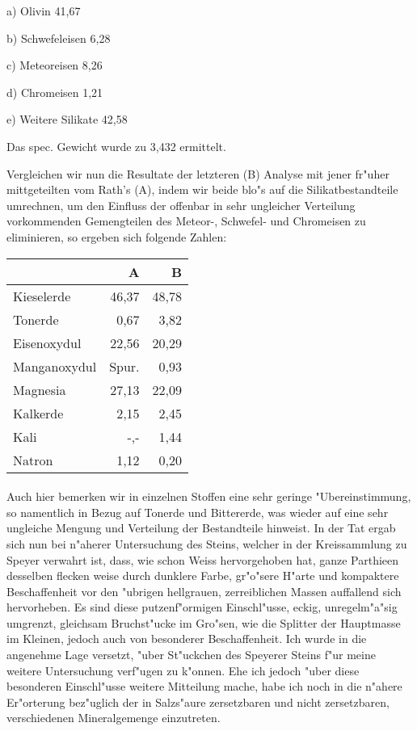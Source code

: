 \documentclass[a4paper, 11pt, oneside]{article}
\begin{document}
a) Olivin 41,67

b) Schwefeleisen 6,28

c) Meteoreisen 8,26

d) Chromeisen 1,21

e) Weitere Silikate 42,58

Das spec. Gewicht wurde zu 3,432 ermittelt.

Vergleichen wir nun die Resultate der letzteren (B) Analyse mit jener fr"uher mittgeteilten vom Rath's (A), indem wir beide blo"s auf die Silikatbestandteile umrechnen, um den Einfluss der offenbar in sehr ungleicher Verteilung vorkommenden Gemengteilen des Meteor-, Schwefel- und Chromeisen zu eliminieren, so ergeben sich folgende Zahlen:
\begin{center}
    \begin{tabular}{ |l|r|r| }
    \hline
    & A & B\\
    \hline\hline
    Kieselerde & 46,37 & 48,78\\\hline
    Tonerde & 0,67 & 3,82\\\hline
    Eisenoxydul & 22,56 & 20,29\\\hline
    Manganoxydul & Spur. & 0,93\\\hline
    Magnesia & 27,13 & 22,09\\\hline
    Kalkerde & 2,15 & 2,45\\\hline
    Kali & -,- & 1,44\\\hline
    Natron & 1,12 & 0,20\\
    \hline
    \end{tabular}
\end{center}
\paragraph{}
Auch hier bemerken wir in einzelnen Stoffen eine sehr geringe "Ubereinstimmung, so namentlich in Bezug auf Tonerde und Bittererde, was wieder auf eine sehr ungleiche Mengung und Verteilung der Bestandteile hinweist. In der Tat ergab sich nun bei n"aherer Untersuchung des Steins, welcher in der Kreissammlung zu Speyer verwahrt ist, dass, wie schon Weiss hervorgehoben hat, ganze Parthieen desselben flecken weise durch dunklere Farbe, gr"o"sere H"arte und kompaktere Beschaffenheit vor den "ubrigen hellgrauen, zerreiblichen Massen auffallend sich hervorheben. Es sind diese putzenf"ormigen Einschl"usse, eckig, unregelm"a"sig umgrenzt, gleichsam Bruchst"ucke im Gro"sen, wie die Splitter der Hauptmasse im Kleinen, jedoch auch von besonderer Beschaffenheit. Ich wurde in die angenehme Lage versetzt, "uber St"uckchen des Speyerer Steins f"ur meine weitere Untersuchung verf"ugen zu k"onnen. Ehe ich jedoch "uber diese besonderen Einschl"usse weitere Mitteilung mache, habe ich noch in die n"ahere Er"orterung bez"uglich der in Salzs"aure zersetzbaren und nicht zersetzbaren, verschiedenen Mineralgemenge einzutreten.
\end{document}
